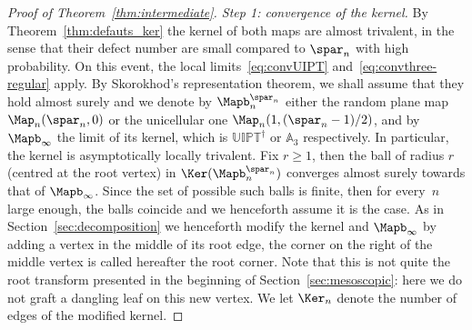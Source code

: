 \begin{proof}[Proof of Theorem~\ref{thm:intermediate}. Step 1: convergence of the kernel]
By Theorem~\ref{thm:defauts_ker} the kernel of both maps are almost trivalent, in the sense that their defect number are small compared to $\spar_n$ with high probability. On this event, the local limits~\eqref{eq:convUIPT} and~\eqref{eq:convthree-regular} apply. By \eg Skorokhod's representation theorem, we shall assume that they hold almost surely and we denote by $\Mapb_n^{\spar_n}$ either the random plane map $\Map_{n}(\spar_{n},0)$ or the unicellular one $\Map_{n}(1, (\spar_{n}-1)/2)$, and by $\Mapb_\infty$ the limit of its kernel, which is $\mathbb{UIPT}^\dagger$ or $\mathbb{A}_3$ respectively. In particular, the kernel is asymptotically locally trivalent.
Fix $r \ge1$, then the ball of radius $r$ (centred at the root vertex) in $\Ker(\Mapb_n^{\spar_n})$ converges almost surely towards that of $\Mapb_\infty$. Since the set of possible such balls is finite, then for \hbox{every}~$n$ large enough, the balls coincide and we henceforth assume it is the case. As in Section~\ref{sec:decomposition} we henceforth modify the kernel and $\Mapb_\infty$ by adding a vertex in the middle of its root edge, the corner on the right of the middle vertex is called hereafter the root corner. Note that this is not quite the root transform presented in the beginning of Section~\ref{sec:mesoscopic}: here we do not graft a dangling leaf on this new vertex.
We let $\Ker_n$ denote the number of edges of the modified kernel.


\end{proof}
